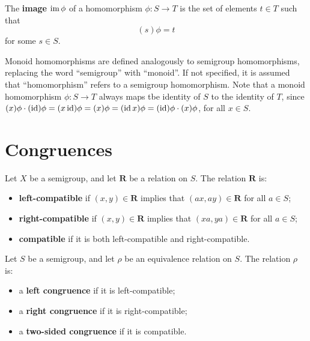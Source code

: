 \begin{definition}
  \label{def:image}
  The \textbf{image} $\operatorname{im}\phi$ of a homomorphism $\phi:S \to T$ is the set of
  elements $t \in T$ such that
  $$(s)\phi = t$$
  for some $s \in S$.
\end{definition}

Monoid homomorphisms are defined analogously to semigroup homomorphisms,
replacing the word ``semigroup'' with ``monoid''.  If not specified, it is
assumed that ``homomorphism'' refers to a semigroup homomorphism.  Note that a
monoid homomorphism $\phi:S \to T$ always maps tbe identity of $S$ to the
identity of $T$, since
$(x)\phi \cdot (\operatorname{id})\phi
= (x \operatorname{id})\phi
= (x)\phi
= (\operatorname{id} x)\phi
= (\operatorname{id})\phi \cdot (x)\phi$,
for all $x \in S$.

\section{Congruences}
\label{sec:intro-congs}

\begin{definition}
  \label{def:compatible}
  Let $X$ be a semigroup, and let $\mathbf{R}$ be a relation on $S$.  The
  relation $\mathbf{R}$ is:
  \begin{itemize}
  \item \textbf{left-compatible} if $(x, y) \in \mathbf{R}$ implies that
    $(ax, ay) \in \mathbf{R}$ for all $a \in S$;
  \item \textbf{right-compatible} if $(x, y) \in \mathbf{R}$ implies that
    $(xa, ya) \in \mathbf{R}$ for all $a \in S$;
  \item \textbf{compatible} if it is both left-compatible and
    right-compatible.
  \end{itemize}
\end{definition}

\begin{definition}
  \label{def:congruence}
  Let $S$ be a semigroup, and let $\rho$ be an equivalence relation on $S$.  The
  relation $\rho$ is:
  \begin{itemize}
  \item a \textbf{left congruence} if it is left-compatible;
  \item a \textbf{right congruence} if it is right-compatible;
  \item a \textbf{two-sided congruence} if it is compatible.
  \end{itemize}
\end{definition}

